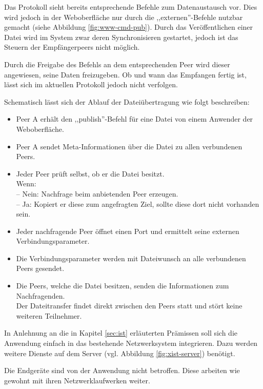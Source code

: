 \documentclass[oneside, ngerman, toc=bibliography,bibliography=totoc,listof=entryprefix, open=right,numbers=noenddot,fontsize=12pt]{scrbook}
\begin{document}
Das Protokoll sieht bereits entsprechende Befehle zum Datenaustausch vor. Dies wird jedoch in der Weboberfläche nur durch die ,,externen''-Befehle nutzbar gemacht (siehe Abbildung \ref{fig:www-cmd-pub}). Durch das Veröffentlichen einer Datei wird im System zwar deren Synchronisieren gestartet, jedoch ist das Steuern der Empfängerpeers nicht möglich.

Durch die Freigabe des Befehls an dem entsprechenden Peer wird dieser angewiesen, seine Daten freizugeben. Ob und wann das Empfangen fertig ist, lässt sich im aktuellen Protokoll jedoch nicht verfolgen. 

\bigskip
Schematisch lässt sich der Ablauf der Dateiübertragung wie folgt beschreiben:

\begin{itemize}
\item Peer A erhält den ,,publish''-Befehl für eine Datei von einem Anwender der Weboberfläche.
\item Peer A sendet Meta-Informationen über die Datei zu allen verbundenen Peers.
\item Jeder Peer prüft selbst, ob er die Datei besitzt.
\\ Wenn: \\
-- Nein: Nachfrage beim anbietenden Peer erzeugen.\\
-- Ja: Kopiert er diese zum angefragten Ziel, sollte diese dort nicht vorhanden sein.\\
\item Jeder nachfragende Peer öffnet einen Port und ermittelt seine externen Verbindungsparameter.
\item Die Verbindungsparameter werden mit Dateiwunsch an alle verbundenen Peers gesendet.
\item Die Peers, welche die Datei besitzen, senden die Informationen zum Nachfragenden.\\
Der Dateitransfer findet direkt zwischen den Peers statt und stört keine weiteren Teilnehmer.
\end{itemize}

In Anlehnung an die in Kapitel \ref{sec:ist} erläuterten Prämissen soll sich die Anwendung einfach in das bestehende Netzwerksystem integrieren. Dazu werden weitere Dienste auf dem Server (vgl. Abbildung \ref{fig:xist-server}) benötigt.
 
Die Endgeräte sind von der Anwendung nicht betroffen. Diese arbeiten wie gewohnt mit ihren Netzwerklaufwerken weiter.
 
\bigskip
 
\end{document}
